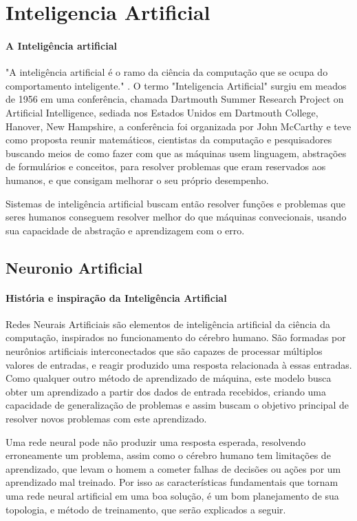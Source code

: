 \documentclass[	12pt, Times, openright, twoside, a4paper, english, brazil]{abntex2}
\begin{document}
      \section{Inteligencia Artificial}
        \paragraph*{A Inteligência artificial} "A inteligência artificial é o ramo da ciência da computação que se ocupa do comportamento inteligente." \cite{Luger2004}.
          O termo "Inteligencia Artificial" surgiu em meados de 1956 em uma conferência, chamada Dartmouth Summer Research Project on Artificial Intelligence, sediada nos Estados Unidos em Dartmouth College, Hanover, New Hampshire, a conferência foi organizada por John McCarthy e teve como proposta reunir matemáticos, cientistas da computação e pesquisadores buscando meios de como fazer com que as máquinas usem linguagem, abstrações de formulários e conceitos, para resolver problemas que eram reservados aos humanos, e que consigam melhorar o seu próprio desempenho.

          Sistemas de inteligência artificial buscam então resolver funções e problemas que seres humanos conseguem resolver melhor do que máquinas convecionais, usando sua capacidade de abstração e aprendizagem com o erro.

        \subsection{Neuronio Artificial}
         
          \paragraph*{História e inspiração da Inteligência Artificial}
            Redes Neurais Artificiais são elementos de inteligência artificial da ciência da computação, inspirados no funcionamento do cérebro humano.
            São formadas por neurônios artificiais interconectados que são capazes de processar múltiplos valores de entradas, e reagir produzido uma resposta relacionada à essas entradas.
            Como qualquer outro método de aprendizado de máquina, este modelo busca obter um aprendizado a partir dos dados de entrada recebidos, criando uma capacidade de generalização de problemas e assim buscam o objetivo principal de resolver novos problemas com este aprendizado.

            Uma rede neural pode não produzir uma resposta esperada, resolvendo erroneamente um problema, assim como o cérebro humano tem limitações de aprendizado, que levam o homem a cometer falhas de decisões ou ações por um aprendizado mal treinado. Por isso as características fundamentais que tornam uma rede neural artificial em uma boa solução, é um bom planejamento de sua topologia, e método de treinamento, que serão explicados a seguir.
\end{document}
